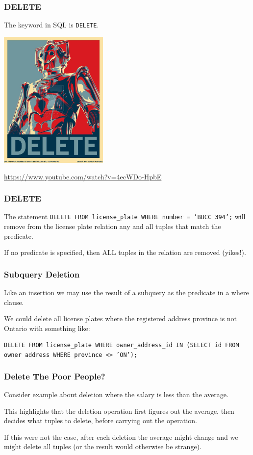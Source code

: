 \begin{frame}
\frametitle{DELETE}

The keyword in SQL is \texttt{DELETE}.

\begin{center}
	\includegraphics[width=0.4\textwidth]{images/delete.jpg}
\end{center}

\url{https://www.youtube.com/watch?v=4ecWDo-HpbE}

\end{frame}



\begin{frame}
\frametitle{DELETE}

The statement \texttt{DELETE FROM license\_plate WHERE number = 'BBCC 394';} will remove from the license plate relation any and all tuples that match the predicate. 

If no predicate is specified, then ALL tuples in the relation are removed (yikes!).

\end{frame}



\begin{frame}
\frametitle{Subquery Deletion}


Like an insertion we may use the result of a subquery as the predicate in a where clause. 

We could delete all license plates where the registered address province is not Ontario with something like: 

\texttt{DELETE FROM license\_plate WHERE owner\_address\_id IN (SELECT id FROM owner address WHERE province <> 'ON');}

\end{frame}



\begin{frame}
\frametitle{Delete The Poor People?}

Consider example about deletion where the salary is less than the average. 

This highlights that the deletion operation first figures out the average, then decides what tuples to delete, before carrying out the operation. 

If this were not the case, after each deletion the average might change and we might delete all tuples (or the result would otherwise be strange). 


\end{frame}



